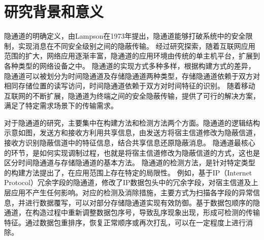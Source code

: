 \section{研究背景和意义}
\label{sec:intro:backgroud}



隐通道的明确定义，由Lampson在1973年提出，隐通道能够打破系统中的安全限制，实现消息在不同安全级别之间的隐蔽传输。
经过研究探索，随着互联网应用范围的扩大，网络应用逐渐丰富，隐通道的应用环境由传统的单主机平台，扩展到各种类型的网络设备之中。
隐通道的实现方式多种多样，根据构建方式的差异，隐通道可以被划分为时间隐通道及存储隐通道两种类型，存储隐通道依赖于双方对相同存储位置的读写访问，时间隐通道依赖于双方对时间特征的识别。
随着移动互联网的不断扩展，隐通道为终端之间的安全隐蔽传输，提供了可行的解决方案，满足了特定需求场景下的传输需求。


对于隐通道的研究，主要集中在构建方法和检测方法两个方面。隐通道的逻辑结构示意如图，发送方和接收方利用共享信息，由发送方将宿主信道修改为隐蔽信道，接收方识别隐蔽信道中的特征信息，结合共享信息还原隐蔽消息。
隐通道最核心的环节，是如何实现调制过程，也就是将宿主信道修改为隐蔽信道的方式，这也是区分时间隐通道与存储隐通道的基本方法。
隐通道的检测方法，是针对特定类型的构建方法提出了，在应用范围上存在特定的局限性。
例如，基于IP（Internet Protocol）冗余字段的隐通道，修改了IP数据包头中的冗余字段，对宿主信道及上层应用不产生任何影响。对应的检测及消除措施，主要方式为扫描各字段的异常信息，并进行数据覆写，可以对部分存储隐通道实现有效防御。基于数据包顺序的隐通道，在构造过程中重新调整数据包序号，导致乱序现象出现，形成可检测的传输特征。通过数据包重排序，恢复正常顺序或再次打乱，可以在一定程度上进行消除。

